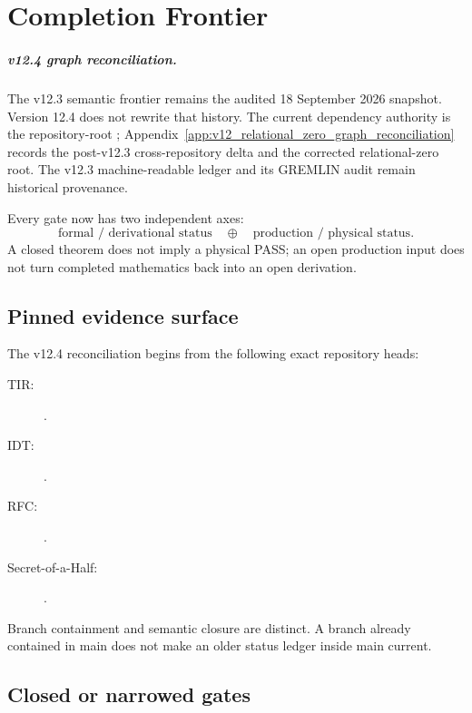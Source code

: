 \documentclass[11pt,a4paper,twoside]{book}
\theoremstyle{definition}
\begin{document}
\chapter{Completion Frontier}
\label{ch:v12_completion_frontier}

\paragraph{v12.4 graph reconciliation.}
The v12.3 semantic frontier remains the audited 18 September 2026 snapshot. Version 12.4 does not rewrite that history. The current dependency authority is the repository-root ; Appendix~\ref{app:v12_relational_zero_graph_reconciliation} records the post-v12.3 cross-repository delta and the corrected relational-zero root. The v12.3 machine-readable ledger and its GREMLIN audit remain historical provenance.

Every gate now has two independent axes:
\[
\boxed{
\text{formal / derivational status}
\quad\oplus\quad
\text{production / physical status}.
}
\]
A closed theorem does not imply a physical PASS; an open production input does
not turn completed mathematics back into an open derivation.

\section{Pinned evidence surface}

The v12.4 reconciliation begins from the following exact repository heads:
\begin{description}
\item[TIR:] .
\item[IDT:] .
\item[RFC:] .
\item[Secret-of-a-Half:] .
\end{description}

Branch containment and semantic closure are distinct. A branch already
contained in main does not make an older status ledger inside main current.

\section{Closed or narrowed gates}
\end{document}
